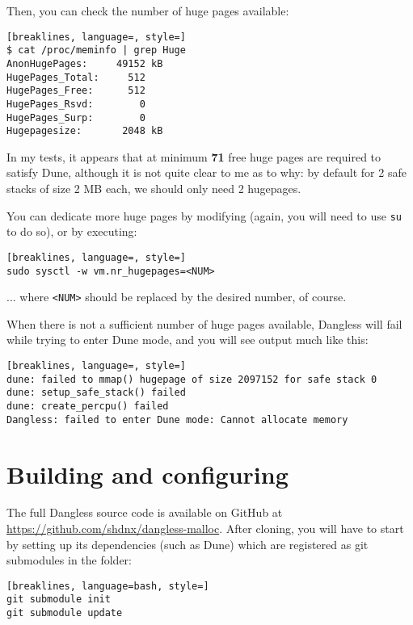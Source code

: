 Then, you can check the number of huge pages available:

\begin{lstlisting}[breaklines, language=, style=]
$ cat /proc/meminfo | grep Huge
AnonHugePages:     49152 kB
HugePages_Total:     512
HugePages_Free:      512
HugePages_Rsvd:        0
HugePages_Surp:        0
Hugepagesize:       2048 kB
\end{lstlisting}

In my tests, it appears that at minimum \textbf{71} free huge pages are required to satisfy Dune, although it is not quite clear to me as to why: by default for 2 safe stacks of size 2 MB each, we should only need 2 hugepages.

You can dedicate more huge pages by modifying  (again, you will need to use \texttt{su} to do so), or by executing:

\begin{lstlisting}[breaklines, language=, style=]
sudo sysctl -w vm.nr_hugepages=<NUM>
\end{lstlisting}

... where \texttt{<NUM>} should be replaced by the desired number, of course.

When there is not a sufficient number of huge pages available, Dangless will fail while trying to enter Dune mode, and you will see output much like this:

\begin{lstlisting}[breaklines, language=, style=]
dune: failed to mmap() hugepage of size 2097152 for safe stack 0
dune: setup_safe_stack() failed
dune: create_percpu() failed
Dangless: failed to enter Dune mode: Cannot allocate memory
\end{lstlisting}

\section{Building and configuring}

The full Dangless source code is available on GitHub at \url{https://github.com/shdnx/dangless-malloc}. After cloning, you will have to start by setting up its dependencies (such as Dune) which are registered as git submodules in the  folder:

\begin{lstlisting}[breaklines, language=bash, style=]
git submodule init
git submodule update
\end{lstlisting}

